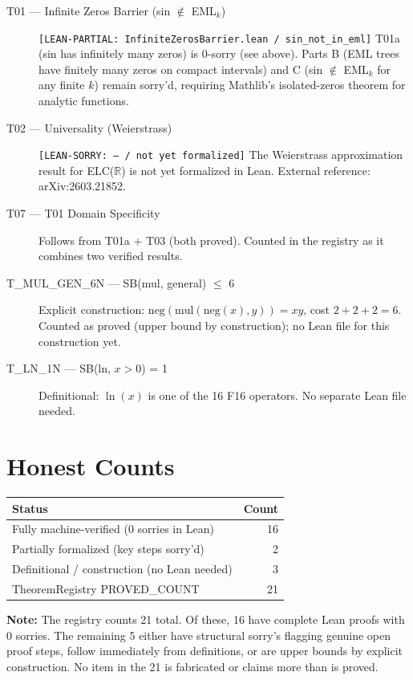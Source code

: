 \documentclass[11pt]{article}
\newcommand{\leansorry}[2]{\textcolor{sorry}{\texttt{[LEAN-SORRY: #1 / #2]}}}
\newcommand{\leanpartial}[2]{\textcolor{partial}{\texttt{[LEAN-PARTIAL: #1 / #2]}}}
\begin{document}
\begin{description}
\item[T01 — Infinite Zeros Barrier (sin $\notin$ EML$_k$)]
  \leanpartial{InfiniteZerosBarrier.lean}{sin\_not\_in\_eml}
  T01a (sin has infinitely many zeros) is 0-sorry (see above).
  Parts B (EML trees have finitely many zeros on compact intervals) and C
  (sin $\notin$ EML$_k$ for any finite $k$) remain sorry'd, requiring Mathlib's
  isolated-zeros theorem for analytic functions.

\item[T02 — Universality (Weierstrass)]
  \leansorry{---}{not yet formalized}
  The Weierstrass approximation result for ELC($\mathbb{R}$) is not yet formalized in Lean.
  External reference: arXiv:2603.21852.

\item[T07 — T01 Domain Specificity]
  Follows from T01a + T03 (both proved). Counted in the registry as it combines two verified results.

\item[T\_MUL\_GEN\_6N — SB(mul, general) $\leq$ 6]
  Explicit construction: $\text{neg}(\text{mul}(\text{neg}(x), y)) = xy$, cost $2+2+2 = 6$.
  Counted as proved (upper bound by construction); no Lean file for this construction yet.

\item[T\_LN\_1N — SB(ln, $x > 0$) = 1]
  Definitional: $\ln(x)$ is one of the 16 F16 operators. No separate Lean file needed.
\end{description}

\section{Honest Counts}

\begin{center}
\begin{tabular}{lr}
\toprule
Status & Count \\
\midrule
Fully machine-verified (0 sorries in Lean) & 16 \\
Partially formalized (key steps sorry'd) & 2 \\
Definitional / construction (no Lean needed) & 3 \\
\midrule
TheoremRegistry PROVED\_COUNT & 21 \\
\bottomrule
\end{tabular}
\end{center}

\noindent\textbf{Note:} The registry counts 21 total. Of these, 16 have complete Lean proofs
with 0 sorries. The remaining 5 either have structural sorry's flagging genuine open proof
steps, follow immediately from definitions, or are upper bounds by explicit construction.
No item in the 21 is fabricated or claims more than is proved.
\end{document}
